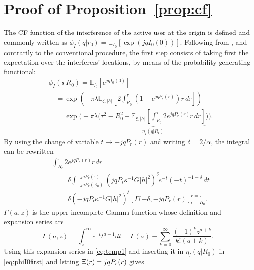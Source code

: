 {\section{Proof of Proposition~\ref{prop:cf}}
\label{sec:proofcf}
The CF function of the interference of the active user at the origin is defined and commonly written as $\phi_{I}(q|r_0) = \mathbb E_{I_0}\left[\exp(jq {I_0}(0))\right]$. Following from \cite{yu2017}, and contrarily to the conventional procedure, the first step consists of taking first the expectation over the interferers' locations, by means of the probability generating functional:
\begin{equation}
\begin{split}\label{eq:phiI0first}
     &\phi_{I}(q|R_0) = \mathbb E_{I_0}\left[e^{jq {I_0}(0)}\right]\\
     &\quad = \exp\left(-{\pi\lambda} \mathbb E_{\xi, |h|}\left[2\int_{R_0}^\tau \!  \left(1- e^{j q {P}_{r}(r)} \right)r \,dr\right]\right)\\
     &\quad = \exp\Bigg(-{\pi\lambda} \Bigg(\underbrace{\tau^2-R_0^2 - \mathbb E_{\xi, |h|}\left[\int_{R_0}^\tau \!  2 e^{j q {P}_{r}(r)} r \,dr\right]}_{\eta_I(q|R_0)}\Bigg)\Bigg).
\end{split}
\end{equation} 
By using the change of variable $t \to -j q {P}_{r}(r)$ and writing $\delta = 2/\alpha$, the integral can be rewritten
\begin{equation}\label{eq:temp1}
\begin{split}
    &\int_{R_0}^\tau \!  2 e^{j q {P}_{r}(r)} r \,dr \\
    &\quad= \delta\int_{-j q {P}_{r}(R_0)}^{-j q {P}_{r}(\tau)} \!\left(j q P_t \kappa^{-1} G  |h|^2\right)^{\delta} e^{-t} (-t)^{-1-\delta} \,dt\\
    &\quad=\delta \left(-j q P_t \kappa^{-1} G |h|^2\right)^\delta\left[\Gamma(-\delta,-j q P_r(r)\right]_{r = R_0}^{r=\tau}.
\end{split}
\end{equation}
$\Gamma(a, z)$ is the upper incomplete Gamma function whose definition and expansion series are \cite{2014xxix}
\begin{equation}
    \Gamma(a, z) = \int_z^{\infty} {e^{-t}}{t^{a-1}}dt = \Gamma(a) - \sum\limits_{k=0}^{\infty} \frac{(-1)^kz^{a+k}}{k! (a+k)}.
\end{equation}
Using this expansion series in \eqref{eq:temp1} and inserting it in $\eta_I(q|R_0)$ in \eqref{eq:phiI0first} and letting $\Xi(r) = j q \Bar{P}_r(r)$ gives
{\small
}}
